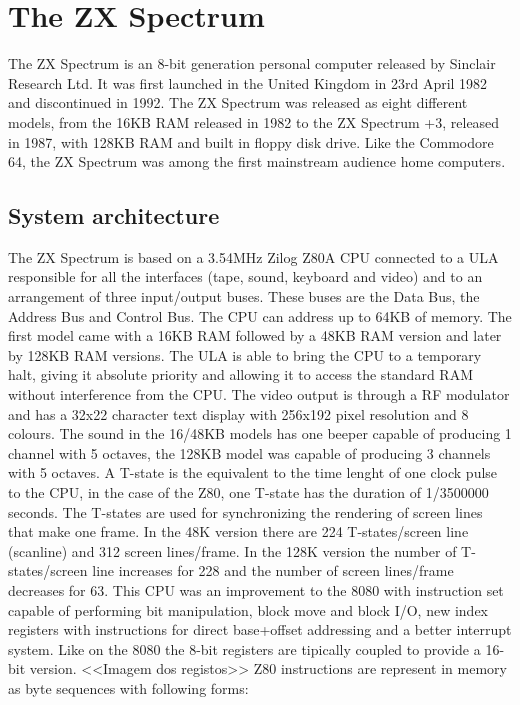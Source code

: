 \section{The ZX Spectrum}
The ZX Spectrum is an 8-bit generation personal computer released by Sinclair Research Ltd. It was first launched in the United Kingdom in 23rd April 1982 and discontinued in 1992. The ZX Spectrum was released as eight different models, from the 16KB RAM released in 1982 to the ZX Spectrum +3, released in 1987, with 128KB RAM and built in floppy disk drive. Like the Commodore 64, the ZX Spectrum was among the first mainstream audience home computers.

\subsection{System architecture}
The ZX Spectrum is based on a 3.54MHz Zilog Z80A CPU connected to a ULA responsible for all the interfaces (tape, sound, keyboard and video) and to an arrangement of three input/output buses. These buses are the Data Bus, the Address Bus and Control Bus. The CPU can address up to 64KB of memory. The first model came with a 16KB RAM followed by a 48KB RAM version and later by 128KB RAM versions. The ULA is able to bring the CPU to a temporary halt, giving it absolute priority and allowing it to access the standard RAM without interference from the CPU. The video output is through a RF modulator and has a 32x22 character text display with 256x192 pixel resolution and 8 colours. The sound in the 16/48KB models has one beeper capable of producing 1 channel with 5 octaves, the 128KB model was capable of producing 3 channels with 5 octaves.
A T-state is the equivalent to the time lenght of one clock pulse to the CPU, in the case of the Z80, one T-state has the duration of 1/3500000 seconds. The T-states are used for synchronizing the rendering of screen lines that make one frame. In the 48K version there are 224 T-states/screen line (scanline) and 312 screen lines/frame. In the 128K version the number of T-states/screen line increases for 228 and the number of screen lines/frame decreases for 63.
This CPU was an improvement to the 8080 with instruction set capable of performing bit manipulation, block move and block I/O, new index registers with instructions for direct base+offset addressing and a better interrupt system. Like on the 8080 the 8-bit registers are tipically coupled to provide a 16-bit version.
<<Imagem dos registos>>
Z80 instructions are represent in memory as byte sequences with following forms:
